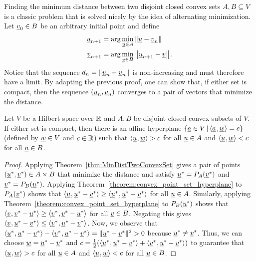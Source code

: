 \begin{remark}
Finding the minimum distance between two disjoint closed convex sets $A,B\subseteq V$ is a classic problem that is solved nicely by the idea of alternating minimization. Let $\underline v_{0}\in B$ be an arbitrary initial point and define
\begin{align*}
\underline u_{n+1} & =\arg\min_{\underline u\in A}\left\Vert \underline u-\underline v_{n}\right\Vert \\
\underline v_{n+1} & =\arg\min_{\underline v\in B}\left\Vert \underline u_{n+1}-\underline v\right\Vert .
\end{align*}
Notice that the sequence $d_{n}=\left\Vert \underline u_{n}-\underline v_{n}\right\Vert $ is non-increasing and must therefore have a limit.
By adapting the previous proof, one can show that, if either set is compact, then the sequence $(\underline u_{n},\underline v_{n})$ converges to a pair of vectors that minimize the distance. %
\end{remark}

\begin{theorem}
Let $V$ be a Hilbert space over $\mathbb{R}$ and $A,B$ be disjoint closed convex subsets of $V$.
If either set is compact, then there is an affine hyperplane $\{ \underline{a} \in V \,|\, {\langle  \underline{a}  \mskip1mu ,  \underline{w}  \rangle} = c \}$ (defined by $\underline{w} \in V$ and $c\in \mathbb{R}$) such that ${\langle  \underline{u}  \mskip1mu ,  \underline{w}  \rangle} > c$ for all $\underline{u} \in A$ and ${\langle  \underline{u}  \mskip1mu ,  \underline{w}  \rangle} < c$ for all $\underline{u} \in B$.
\end{theorem}
\begin{proof}
Applying Theorem~\ref{thm:MinDistTwoConvexSet} gives a pair of points $(\underline{u}^*,\underline{v}^*) \in A \times B$ that minimize the distance and satisfy $\underline{u}^* = P_A (\underline{v}^*)$ and $\underline{v}^* = P_B (\underline{u}^*)$.
Applying Theorem~\ref{theorem:convex_point_set_hyperplane} to $P_A (\underline{v}^*)$ shows that ${\langle  \underline{u}  \mskip1mu ,  \underline{u}^* - \underline{v}^*  \rangle} \geq {\langle  \underline{u}^*  \mskip1mu ,  \underline{u}^* - \underline{v}^*  \rangle}$ for all $\underline{u} \in A$.
Similarly, applying Theorem~\ref{theorem:convex_point_set_hyperplane} to $P_B (\underline{u}^*)$ shows that ${\langle  \underline{v}  \mskip1mu ,  \underline{v}^* - \underline{u}^*  \rangle} \geq {\langle  \underline{v}^*  \mskip1mu ,  \underline{v}^* - \underline{u}^*  \rangle}$ for all $\underline{v} \in B$.
Negating this gives ${\langle  \underline{v}  \mskip1mu ,  \underline{u}^* - \underline{v}^*  \rangle} \leq {\langle  \underline{v}^*  \mskip1mu ,  \underline{u}^* - \underline{v}^*  \rangle}$.
Now, we observe that  ${\langle  \underline{u}^*  \mskip1mu ,  \underline{u}^* - \underline{v}^*  \rangle} - {\langle  \underline{v}^*  \mskip1mu ,  \underline{u}^* - \underline{v}^*  \rangle} = \| \underline{u}^* - \underline{v}^* \|^2 > 0$ because $\underline{u}^* \neq \underline{v}^*$.
Thus, we can choose $\underline{w} = \underline{u}^* - \underline{v}^*$ and $c=\frac{1}{2}({\langle  \underline{u}^*  \mskip1mu ,  \underline{u}^* - \underline{v}^*  \rangle} + {\langle  \underline{v}^*  \mskip1mu ,  \underline{u}^* - \underline{v}^*  \rangle})$  to guarantee that ${\langle  \underline{u}  \mskip1mu ,  \underline{w}  \rangle} > c$ for all $\underline{u} \in A$ and ${\langle  \underline{u}  \mskip1mu ,  \underline{w}  \rangle} < c$ for all $\underline{u} \in B$.
\end{proof}

